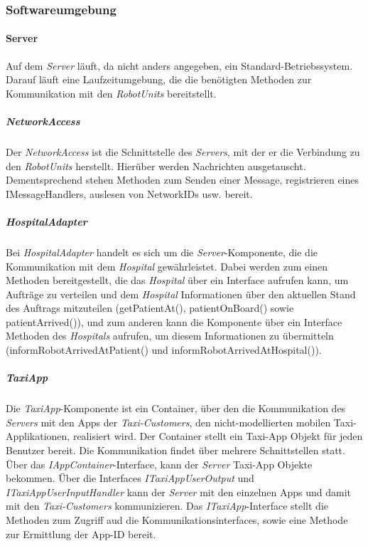   \subsubsection{Softwareumgebung}

    \paragraph{Server}\label{server}
    		Auf dem \emph{Server} läuft, da nicht anders angegeben, ein Standard-Betriebssystem.
    		Darauf läuft eine Laufzeitumgebung, die die benötigten Methoden zur Kommunikation mit den \emph{RobotUnits} bereitstellt.
    	\subparagraph{NetworkAccess}\label{networkaccess}
    		Der \emph{NetworkAccess} ist die Schnittstelle des \emph{Servers}, mit der er die Verbindung zu den \emph{RobotUnits} herstellt.
        Hierüber werden Nachrichten ausgetauscht.
    		Dementsprechend stehen Methoden zum Senden einer Message, registrieren eines IMessageHandlers, auslesen von NetworkIDs usw. bereit.
    	\subparagraph{HospitalAdapter}\label{hospital}
    		Bei \emph{HospitalAdapter} handelt es sich um die \emph{Server}-Komponente, die die Kommunikation mit dem \emph{Hospital} gewährleistet.
    		Dabei werden zum einen Methoden bereitgestellt, die das \emph{Hospital} über ein Interface aufrufen kann, um Aufträge zu verteilen und dem \emph{Hospital} Informationen über den aktuellen Stand des Auftrags mitzuteilen (getPatientAt(), patientOnBoard() sowie patientArrived()), und zum anderen kann die Komponente über ein Interface Methoden des \emph{Hospitals} aufrufen, um diesem Informationen zu übermitteln (informRobotArrivedAtPatient() und informRobotArrivedAtHospital()).
      \subparagraph{TaxiApp}
        Die \emph{TaxiApp}-Komponente ist ein Container, über den die Kommunikation des \emph{Servers} mit den Apps der \emph{Taxi-Customers}, den nicht-modellierten mobilen Taxi-Applikationen, realisiert wird.
        Der Container stellt ein Taxi-App Objekt für jeden Benutzer bereit.
        Die Kommunikation findet über mehrere Schnittstellen statt.
        Über das \emph{IAppContainer}-Interface, kann der \emph{Server} Taxi-App Objekte bekommen.
        Über die Interfaces \emph{ITaxiAppUserOutput} und \emph{ITaxiAppUserInputHandler} kann der \emph{Server} mit den einzelnen Apps und damit mit den \emph{Taxi-Customers} kommunizieren.
        Das \emph{ITaxiApp}-Interface stellt die Methoden zum Zugriff aud die Kommunikationsinterfaces, sowie eine Methode zur Ermittlung der App-ID bereit.
